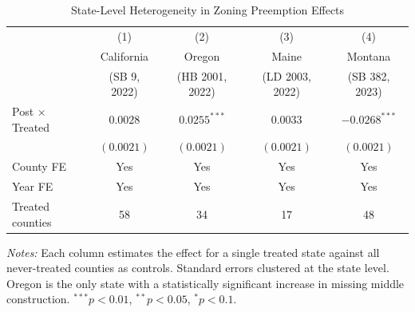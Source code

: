 \begin{table}[htbp]
\centering
\caption{State-Level Heterogeneity in Zoning Preemption Effects}
\label{tab:states}
\begin{threeparttable}
\begin{tabular}{lcccc}
\hline\hline
 & (1) & (2) & (3) & (4) \\
 & California & Oregon & Maine & Montana \\
 & (SB 9, 2022) & (HB 2001, 2022) & (LD 2003, 2022) & (SB 382, 2023) \\
\hline
Post $\times$ Treated & $0.0028$ & $0.0255^{***}$ & $0.0033$ & $-0.0268^{***}$ \\
 & $(0.0021)$ & $(0.0021)$ & $(0.0021)$ & $(0.0021)$ \\
\hline
County FE & Yes & Yes & Yes & Yes \\
Year FE & Yes & Yes & Yes & Yes \\
Treated counties & 58 & 34 & 17 & 48 \\
\hline\hline
\end{tabular}
\begin{tablenotes}[flushleft]\small
\item \textit{Notes:} Each column estimates the effect for a single treated state against all never-treated counties as controls. Standard errors clustered at the state level. Oregon is the only state with a statistically significant increase in missing middle construction. $^{***}p<0.01$, $^{**}p<0.05$, $^{*}p<0.1$.
\end{tablenotes}
\end{threeparttable}
\end{table}

